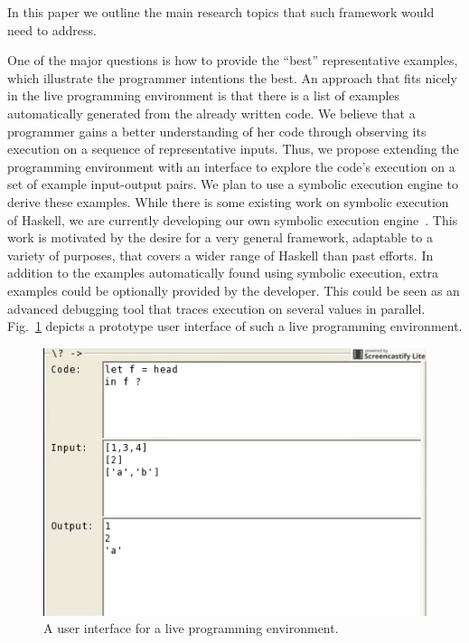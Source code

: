\noindent{}

In this paper we outline the main research topics that such framework would need to address. 

One of the major questions is how to provide the ``best'' representative examples, 
which illustrate the programmer intentions the best. An approach that fits nicely
in the live programming environment is that there is a list of examples automatically
generated from the already written code. We believe that a programmer gains a better understanding of her code through observing its execution on a sequence of representative inputs. Thus, we propose extending the programming environment with an interface to explore the code's execution on a set of example input-output pairs. We plan to use a symbolic execution engine to derive these examples.  While there is some existing work on symbolic execution of Haskell, we are currently developing our own symbolic execution engine~\cite{contract, HallahanTAPAS17}.  This work is motivated by the desire for a very general framework, adaptable to a variety of purposes,  that covers a wider range of Haskell than past efforts.
In addition to the examples automatically found using symbolic execution, extra examples could be optionally provided by the developer. This could be seen as an advanced debugging tool that traces execution on several values in parallel. Fig.~\ref{fig:tool} depicts a prototype user interface of such a live programming environment.

\begin{figure}[h!]
\centering
\includegraphics[scale=0.5]{tool}
\caption{A user interface for a live programming environment.}
\label{fig:tool}
\end{figure}

